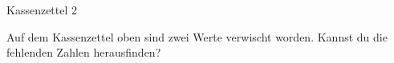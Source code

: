 \documentclass[12pt,a5paper,landscape]{scrartcl}
\begin{document}
	\begin{karte2}{Kassenzettel 2}
		\begin{center}
		\end{center}

		Auf dem Kassenzettel oben sind zwei Werte verwischt worden. Kannst du die fehlenden Zahlen herausfinden?

	\end{karte2}

	\leereKarte
\end{document}
